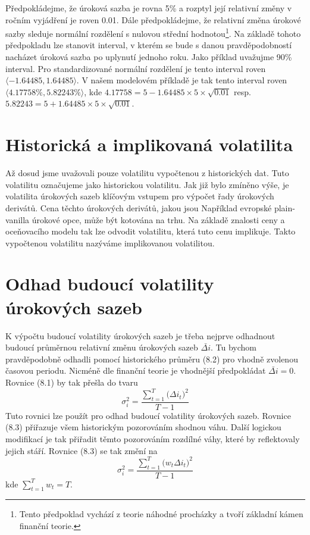 \documentclass[a4paper]{book}
\begin{document}
Předpokládejme, že úroková sazba je rovna 5\% a rozptyl její relativní změny v ročním vyjádření je roven 0.01. Dále předpokládejme, že relativní změna úrokové sazby sleduje normální rozdělení s nulovou střední hodnotou\footnote{Tento předpoklad vychází z teorie náhodné procházky a tvoří základní kámen finanční teorie.}. Na základě tohoto předpokladu lze stanovit interval, v kterém se bude s danou pravděpodobností nacházet úroková sazba po uplynutí jednoho roku. Jako příklad uvažujme 90\% interval. Pro standardizované normální rozdělení je tento interval roven $\langle -1.64485, 1.64485 \rangle$. V našem modelovém příkladě je tak tento interval roven $\langle 4.17758\%, 5.82243\% \rangle$,
kde $4.17758 = 5 - 1.64485 \times 5 \times \sqrt{0.01}$ resp. $5.82243 = 5 + 1.64485 \times 5 \times \sqrt{0.01}$.

\section{Historická a implikovaná volatilita}

Až dosud jsme uvažovali pouze volatilitu vypočtenou z historických dat. Tuto volatilitu označujeme jako historickou volatilitu. Jak již bylo zmíněno výše, je volatilita úrokových sazeb klíčovým vstupem pro výpočet řady úrokových derivátů. Cena těchto úrokových derivátů, jakou jsou Například evropské plain-vanilla úrokové opce, může být kotována na trhu. Na základě znalosti ceny a oceňovacího modelu tak lze odvodit volatilitu, která tuto cenu implikuje. Takto vypočtenou volatilitu nazýváme implikovanou volatilitou.

\section{Odhad budoucí volatility úrokových sazeb}

K výpočtu budoucí volatility úrokových sazeb je třeba nejprve odhadnout budoucí průměrnou relativní změnu úrokových sazeb $\bar{\Delta i}$. Tu bychom pravděpodobně odhadli pomocí historického průměru (8.2) pro vhodně zvolenou časovou periodu. Nicméně dle finanční teorie je vhodnější předpokládat $\bar{\Delta i} = 0$. Rovnice (8.1) by tak přešla do tvaru
\begin{equation}
\sigma^2_i = \frac{\sum_{t=1}^T \big( \Delta i_t \big)^2}{T - 1}
\end{equation}
Tuto rovnici lze použít pro odhad budoucí volatility úrokových sazeb. Rovnice (8.3) přiřazuje všem historickým pozorováním shodnou váhu. Další logickou modifikací je tak přiřadit těmto pozorováním rozdílné váhy, které by reflektovaly jejich stáří. Rovnice (8.3) se tak změní na
\begin{equation}
\sigma^2_i = \frac{\sum_{t=1}^T \big( w_t \Delta i_t \big)^2}{T - 1}
\end{equation}
kde $\sum_{t = 1}^T w_t = T$.
\end{document}
